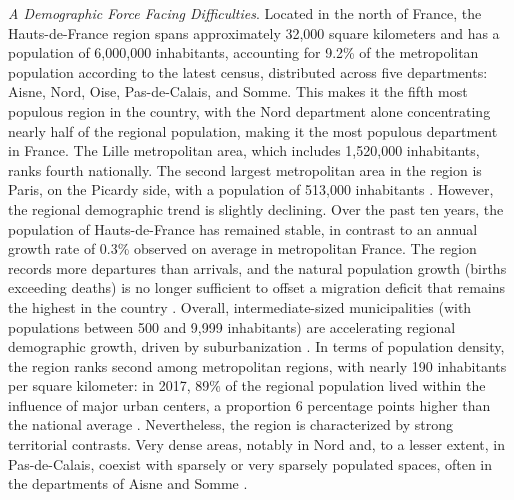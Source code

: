 \begin{refsegment}
\textsl{A Demographic Force Facing Difficulties}. Located in the north of France, the Hauts-de-France region spans approximately 32,000 square kilometers and has a population of 6,000,000 inhabitants, accounting for 9.2\% of the metropolitan population according to the latest census, distributed across five departments: Aisne, Nord, Oise, Pas-de-Calais, and Somme. This makes it the fifth most populous region in the country, with the Nord department alone concentrating nearly half of the regional population, making it the most populous department in France. The Lille metropolitan area, which includes 1,520,000 inhabitants, ranks fourth nationally. The second largest metropolitan area in the region is Paris, on the Picardy side, with a population of 513,000 inhabitants \textcolor{blue}{\autocite{leroux_region_2023}}. However, the regional demographic trend is slightly declining. Over the past ten years, the population of Hauts-de-France has remained stable, in contrast to an annual growth rate of 0.3\% observed on average in metropolitan France. The region records more departures than arrivals, and the natural population growth (births exceeding deaths) is no longer sufficient to offset a migration deficit that remains the highest in the country \textcolor{blue}{\autocite{insee_essentiel_2024}}. Overall, intermediate-sized municipalities (with populations between 500 and 9,999 inhabitants) are accelerating regional demographic growth, driven by suburbanization \textcolor{blue}{\autocite{leroux_region_2023}}. In terms of population density, the region ranks second among metropolitan regions, with nearly 190 inhabitants per square kilometer: in 2017, 89\% of the regional population lived within the influence of major urban centers, a proportion 6 percentage points higher than the national average \textcolor{blue}{\autocite{insee_plus_2020}}. Nevertheless, the region is characterized by strong territorial contrasts. Very dense areas, notably in Nord and, to a lesser extent, in Pas-de-Calais, coexist with sparsely or very sparsely populated spaces, often in the departments of Aisne and Somme \textcolor{blue}{\autocite{ministere_de_la_culture_atlas_2023}}.%


\end{refsegment}
